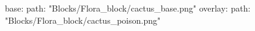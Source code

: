 base:
  path: "Blocks/Flora_block/cactus_base.png"
overlay:
  path: "Blocks/Flora_block/cactus_poison.png"